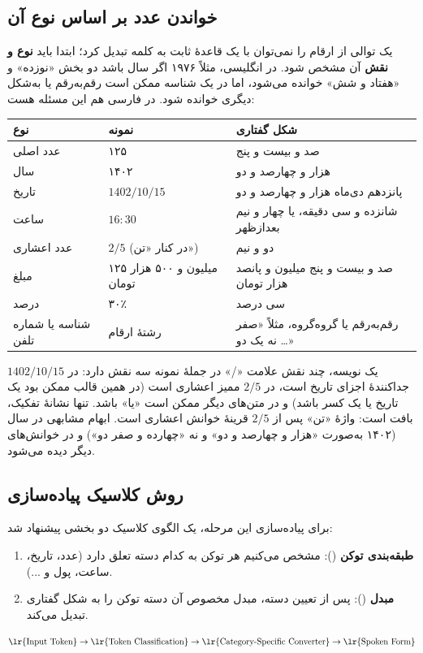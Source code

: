 \subsection{خواندن عدد بر اساس نوع آن}
یک توالی از ارقام را نمی‌توان با یک قاعدهٔ ثابت به کلمه تبدیل کرد؛ ابتدا باید \textbf{نوع و نقش} آن مشخص شود. در انگلیسی، مثلاً ۱۹۷۶ اگر سال باشد دو بخش «نوزده» و «هفتاد و شش» خوانده می‌شود، اما در یک شناسه ممکن است رقم‌به‌رقم یا به‌شکل دیگری خوانده شود. در فارسی هم این مسئله هست:

\begin{center}
\small
\begin{tabular}{llp{6.6cm}}
\toprule
نوع & نمونه & شکل گفتاری \\
\midrule
عدد اصلی & ۱۲۵ & صد و بیست و پنج \\
سال & ۱۴۰۲ & هزار و چهارصد و دو \\
تاریخ & $1402/10/15$ & پانزدهم دی‌ماه هزار و چهارصد و دو \\
ساعت & $16{:}30$ & شانزده و سی دقیقه، یا چهار و نیم بعدازظهر \\
عدد اعشاری & $2/5$ (در کنار «تن») & دو و نیم \\
مبلغ & ۱۲۵ میلیون و ۵۰۰ هزار تومان & صد و بیست و پنج میلیون و پانصد هزار تومان \\
درصد & ۳۰٪ & سی درصد \\
شناسه یا شماره تلفن & رشتهٔ ارقام & رقم‌به‌رقم یا گروه‌گروه، مثلاً «صفر نه یک دو …» \\
\bottomrule
\end{tabular}
\end{center}

\begin{warningbox}{یک نویسه، چند نقش}
علامت «/» در جملهٔ نمونه سه نقش دارد: در $1402/10/15$ جداکنندهٔ اجزای تاریخ است، در $2/5$ ممیز اعشاری است (در همین قالب ممکن بود یک تاریخ یا یک کسر باشد) و در متن‌های دیگر ممکن است «یا» باشد. تنها نشانهٔ تفکیک، بافت است: واژهٔ «تن» پس از $2/5$ قرینهٔ خوانش اعشاری است. ابهام مشابهی در سال (۱۴۰۲ به‌صورت «هزار و چهارصد و دو» و نه «چهارده و صفر دو») و در خوانش‌های دیگر دیده می‌شود.
\end{warningbox}

\subsection{روش کلاسیک پیاده‌سازی}
برای پیاده‌سازی این مرحله، یک الگوی کلاسیک دو بخشی پیشنهاد شد:
\begin{enumerate}
  \item \textbf{طبقه‌بندی توکن} (): مشخص می‌کنیم هر توکن به کدام دسته تعلق دارد (عدد، تاریخ، ساعت، پول و ...).
  \item \textbf{مبدل} (): پس از تعیین دسته، مبدل مخصوص آن دسته توکن را به شکل گفتاری تبدیل می‌کند.
\end{enumerate}
\[
\text{\lr{Input Token}} \to \text{\lr{Token Classification}} \to \text{\lr{Category-Specific Converter}} \to \text{\lr{Spoken Form}}
\]


